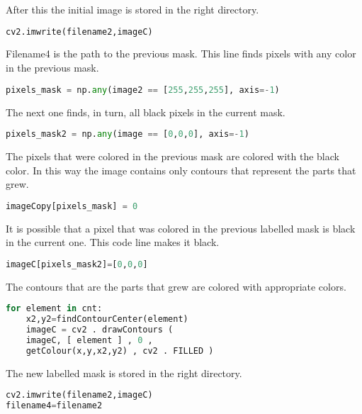 \documentclass[12pt]{article}
\begin{document}
After this the initial image is stored in the right directory. 
\vspace{5mm}
\begin{lstlisting}[language=Python]
cv2.imwrite(filename2,imageC)
\end{lstlisting}\vspace{5mm}
Filename4 is the path to the previous mask.
\vspace{5mm}
This line finds pixels with any color in the previous mask.
\begin{lstlisting}[language=Python]
pixels_mask = np.any(image2 == [255,255,255], axis=-1)
\end{lstlisting}\vspace{5mm}
The next one finds, in turn, all black pixels in the current mask. 
\vspace{5mm}
\begin{lstlisting}[language=Python]
pixels_mask2 = np.any(image == [0,0,0], axis=-1)
\end{lstlisting}
\vspace{5mm}
The pixels that were colored in the previous mask are colored with the black color. In this way the image contains only contours that represent the parts that grew.
\vspace{5mm}
\begin{lstlisting}[language=Python]
imageCopy[pixels_mask] = 0
\end{lstlisting}
\vspace{5mm}
It is possible that a pixel that was colored in the previous labelled mask is black in the current one. This code line makes it black.
\vspace{5mm}
\begin{lstlisting}[language=Python]
imageC[pixels_mask2]=[0,0,0]
\end{lstlisting}
\vspace{5mm}
The contours that are the parts that grew are colored with appropriate colors.
\vspace{5mm}
\begin{lstlisting}[language=Python]
for element in cnt:
	x2,y2=findContourCenter(element)
	imageC = cv2 . drawContours ( 
	imageC, [ element ] , 0 ,
	getColour(x,y,x2,y2) , cv2 . FILLED )
\end{lstlisting}
\vspace{5mm}
The new labelled mask is stored in the right directory.
\vspace{5mm}
\begin{lstlisting}[language=Python]
cv2.imwrite(filename2,imageC)
filename4=filename2
\end{lstlisting}
\end{document}
